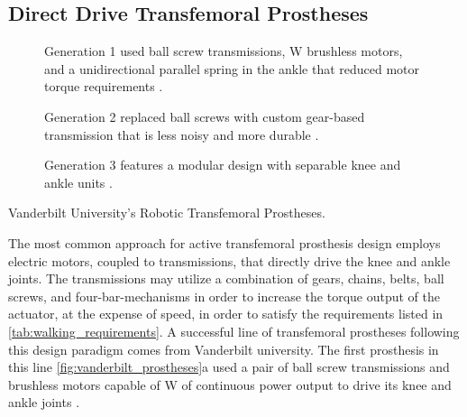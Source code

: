 \subsection{Direct Drive Transfemoral Prostheses}\label{sec:back_direct_drive}
\begin{marginfigure}
    \centering
	\begin{subfigure}[t]{\linewidth}
    	\centering
        \caption{Generation 1 used ball screw transmissions, \unit[200]{W}
        brushless motors, and a unidirectional parallel spring in the ankle that
        reduced motor torque requirements \citep{sup2009preliminary}.}
        \label{fig:vanderbilt_gen_1}
	\end{subfigure}

	\begin{subfigure}[t]{\linewidth}
    	\centering
        \caption{Generation 2 replaced ball screws with custom gear-based
        transmission that is less noisy and more durable
        \citep{lawson2013control}.}
        \label{fig:vanderbilt_gen_2}
	\end{subfigure}

	\begin{subfigure}[t]{\linewidth}
    	\centering
        \caption{Generation 3 features a modular design with separable knee and
        ankle units \citep{lawson2014robotic}.}
        \label{fig:vanderbilt_gen_3}
	\end{subfigure}
    \caption{Vanderbilt University's Robotic Transfemoral Prostheses.}
    \label{fig:vanderbilt_prostheses}
\end{marginfigure}

The most common approach for active transfemoral prosthesis design employs
electric motors, coupled to transmissions, that directly drive the knee and
ankle joints. The transmissions may utilize a combination of gears, chains,
belts, ball screws, and four-bar-mechanisms in order to increase the torque
output of the actuator, at the expense of speed, in order to satisfy the
requirements listed in \cref{tab:walking_requirements}. A successful line of
transfemoral prostheses following this design paradigm comes from Vanderbilt
university. The first prosthesis in this line \cref{fig:vanderbilt_prostheses}a
used a pair of ball screw transmissions and brushless motors capable of
\unit[200]{W} of continuous power output to drive its knee and ankle joints
\citep{sup2009preliminary}. 

